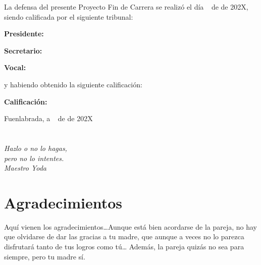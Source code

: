 \documentclass[a4paper, 12pt]{book}
\begin{document}
\vspace{1cm}
La defensa del presente Proyecto Fin de Carrera se realizó el día \qquad$\;\,$ de \qquad\qquad\qquad\qquad \newline de 202X, siendo calificada por el siguiente tribunal:


\vspace{0.5cm}
\textbf{Presidente:}

\vspace{1.2cm}
\textbf{Secretario:}

\vspace{1.2cm}
\textbf{Vocal:}


\vspace{1.2cm}
y habiendo obtenido la siguiente calificación:

\vspace{1cm}
\textbf{Calificación:}


\vspace{1cm}
\begin{flushright}
Fuenlabrada, a \qquad$\;\,$ de \qquad\qquad\qquad\qquad de 202X
\end{flushright}


\chapter*{}
\begin{flushright}
\textit{Hazlo o no lo hagas, \\
pero no lo intentes. \\
Maestro Yoda}
\end{flushright}


\chapter*{Agradecimientos}

Aquí vienen los agradecimientos\ldots Aunque está bien acordarse de la pareja, no hay que olvidarse de dar las gracias a tu madre, que aunque a veces no lo parezca disfrutará tanto de tus logros como tú\ldots 
Además, la pareja quizás no sea para siempre, pero tu madre sí.
\end{document}
